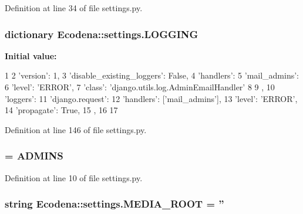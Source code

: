 Definition at line 34 of file settings.py.

\hypertarget{namespace_ecodena_1_1settings_a059398c196fa49b419335d3b542a7d6a}{
\subsubsection[{LOGGING}]{\setlength{\rightskip}{0pt plus 5cm}dictionary {\bf Ecodena::settings.LOGGING}}}
\label{d1/d62/namespace_ecodena_1_1settings_a059398c196fa49b419335d3b542a7d6a}
{\bfseries Initial value:}
\begin{DoxyCode}
1 {
2     'version': 1,
3     'disable_existing_loggers': False,
4     'handlers': {
5         'mail_admins': {
6             'level': 'ERROR',
7             'class': 'django.utils.log.AdminEmailHandler'
8         }
9     },
10     'loggers': {
11         'django.request': {
12             'handlers': ['mail_admins'],
13             'level': 'ERROR',
14             'propagate': True,
15         },
16     }
17 }
\end{DoxyCode}


Definition at line 146 of file settings.py.

\hypertarget{namespace_ecodena_1_1settings_a93df833e1153a1f905d48d47bb66429f}{
\subsubsection[{MANAGERS}]{ = {\bf ADMINS}}}
\label{d1/d62/namespace_ecodena_1_1settings_a93df833e1153a1f905d48d47bb66429f}


Definition at line 10 of file settings.py.

\hypertarget{namespace_ecodena_1_1settings_affcc45f7cd0410fa1c0c452089c0023f}{
\subsubsection[{MEDIA\_\-ROOT}]{\setlength{\rightskip}{0pt plus 5cm}string {\bf Ecodena::settings.MEDIA\_\-ROOT} = ''}}
\label{d1/d62/namespace_ecodena_1_1settings_affcc45f7cd0410fa1c0c452089c0023f}



